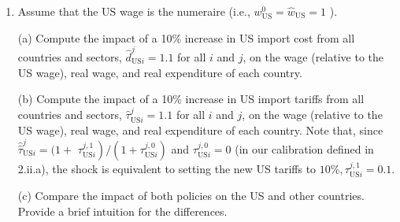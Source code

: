 \documentclass[12pt,oneside,reqno]{article}
\begin{document}
\begin{enumerate}
\item Assume that the US wage is the numeraire (i.e., $w_{\mathrm{US}}^{0}=\hat{w}_{\mathrm{US}}=1$ ).

(a) Compute the impact of a 10\% increase in US import cost from all countries and sectors, $\hat{d}_{\mathrm{US} i}^{j}=1.1$ for all $i$ and $j$, on the wage (relative to the US wage), real wage, and real expenditure of each country.

(b) Compute the impact of a 10\% increase in US import tariffs from all countries and sectors, $\hat{\tau}_{\mathrm{US} i}^{j}=1.1$ for all $i$ and $j$, on the wage (relative to the US wage), real wage, and real expenditure of each country. Note that, since $\hat{\hat{\tau}}_{\mathrm{US} i}^{j}=(1+$ $\left.\tau_{\mathrm{US} i}^{j, 1}\right) /\left(1+\tau_{\mathrm{US} i}^{j, 0}\right)$ and $\tau_{\mathrm{US} i}^{j, 0}=0$ (in our calibration defined in 2.ii.a), the shock is equivalent to setting the new US tariffs to $10 \%, \tau_{\mathrm{US} i}^{j, 1}=0.1$.

(c) Compare the impact of both policies on the US and other countries. Provide a brief intuition for the differences.

\end{enumerate}
\end{document}
